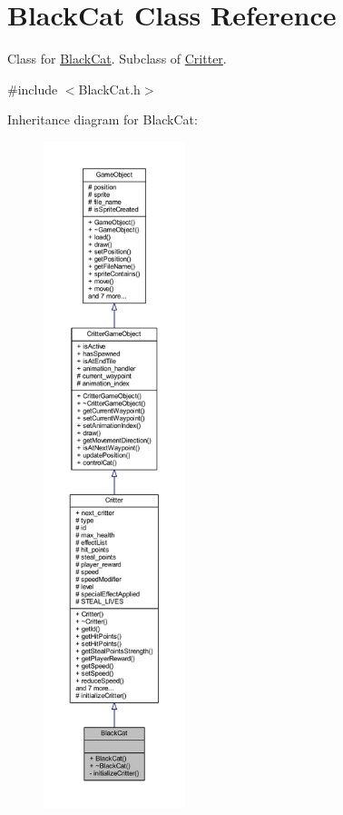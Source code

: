\hypertarget{class_black_cat}{\section{Black\+Cat Class Reference}
\label{class_black_cat}
}


Class for \hyperlink{class_black_cat}{Black\+Cat}. Subclass of \hyperlink{class_critter}{Critter}.  




{\ttfamily \#include $<$Black\+Cat.\+h$>$}



Inheritance diagram for Black\+Cat\+:
\nopagebreak
\begin{figure}[H]
\begin{center}
\leavevmode
\includegraphics[height=550pt]{class_black_cat__inherit__graph}
\end{center}
\end{figure}


